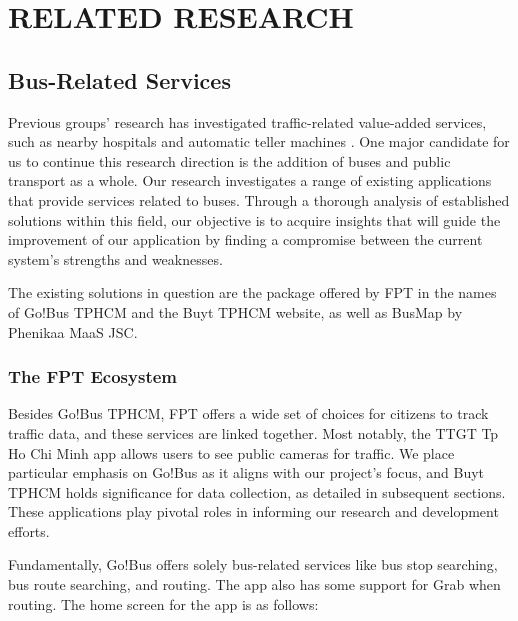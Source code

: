 %
%
\section{RELATED RESEARCH}
\label{section:related_research}

\subsection{Bus-Related Services}

Previous groups' research has investigated traffic-related value-added services, such as nearby hospitals and automatic teller machines \cite{added_services}. One major candidate for us to continue this research direction is the addition of buses and public transport as a whole. Our research investigates a range of existing applications that provide services related to buses. Through a thorough analysis of established solutions within this field, our objective is to acquire insights that will guide the improvement of our application by finding a compromise between the current system's strengths and weaknesses.

The existing solutions in question are the package offered by FPT in the names of Go!Bus TPHCM and the Buyt TPHCM website, as well as BusMap by Phenikaa MaaS JSC.

\subsubsection{The FPT Ecosystem}

Besides Go!Bus TPHCM, FPT offers a wide set of choices for citizens to track traﬀic data, and these services are linked together. Most notably, the TTGT Tp Ho Chi Minh app allows users to see public cameras for traﬀic. We place particular emphasis on Go!Bus as it aligns with our project's focus, and Buyt TPHCM holds significance for data collection, as detailed in subsequent sections. These applications play pivotal roles in informing our research and development efforts.


Fundamentally, Go!Bus offers solely bus-related services like bus stop searching, bus route searching, and routing. The app also has some support for Grab when routing. The home screen for the app is as follows:

